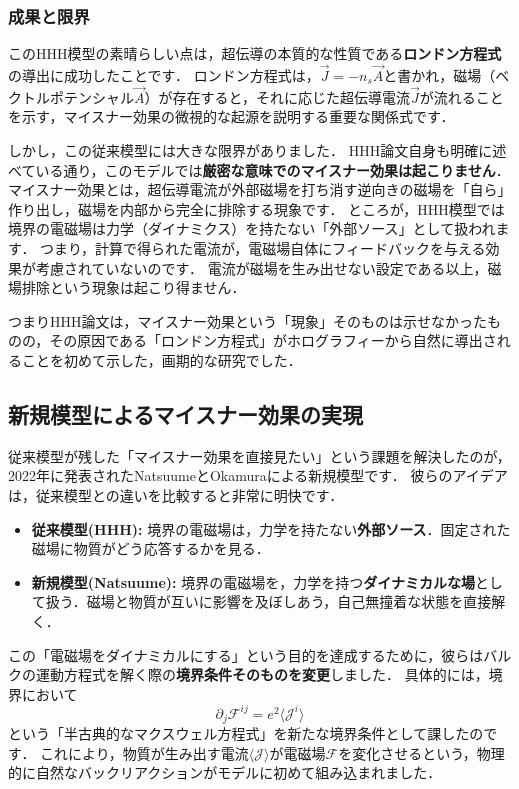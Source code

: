\documentclass[b5paper,11pt,dvipdfmx]{jsarticle}
\numberwithin{equation}{section}
\theoremstyle{definition}
\begin{document}
\subsubsection*{成果と限界}

このHHH模型の素晴らしい点は，超伝導の本質的な性質である\textbf{ロンドン方程式}の導出に成功したことです\cite{Hartnoll08b}．
ロンドン方程式は，$ \vec{J} = -n_s \vec{A} $と書かれ，磁場（ベクトルポテンシャル$\vec{A}$）が存在すると，それに応じた超伝導電流$\vec{J}$が流れることを示す，マイスナー効果の微視的な起源を説明する重要な関係式です．

しかし，この従来模型には大きな限界がありました．
HHH論文自身も明確に述べている通り，このモデルでは\textbf{厳密な意味でのマイスナー効果は起こりません}．
マイスナー効果とは，超伝導電流が外部磁場を打ち消す逆向きの磁場を「自ら」作り出し，磁場を内部から完全に排除する現象です．
ところが，HHH模型では境界の電磁場は力学（ダイナミクス）を持たない「外部ソース」として扱われます．
つまり，計算で得られた電流が，電磁場自体にフィードバックを与える効果が考慮されていないのです．
電流が磁場を生み出せない設定である以上，磁場排除という現象は起こり得ません．

つまりHHH論文は，マイスナー効果という「現象」そのものは示せなかったものの，その原因である「ロンドン方程式」がホログラフィーから自然に導出されることを初めて示した，画期的な研究でした．

\subsection{新規模型によるマイスナー効果の実現}

従来模型が残した「マイスナー効果を直接見たい」という課題を解決したのが，2022年に発表されたNatsuumeとOkamuraによる新規模型です\cite{Natsuume22}．
彼らのアイデアは，従来模型との違いを比較すると非常に明快です．

\begin{itemize}
    \item \textbf{従来模型(HHH):} 境界の電磁場は，力学を持たない\textbf{外部ソース}．固定された磁場に物質がどう応答するかを見る．
    \item \textbf{新規模型(Natsuume):} 境界の電磁場を，力学を持つ\textbf{ダイナミカルな場}として扱う．磁場と物質が互いに影響を及ぼしあう，自己無撞着な状態を直接解く．
\end{itemize}

この「電磁場をダイナミカルにする」という目的を達成するために，彼らはバルクの運動方程式を解く際の\textbf{境界条件そのものを変更}しました．
具体的には，境界において
\begin{equation}
    \partial_{j} \mathcal{F}^{ij} = e^{2} \langle \mathcal{J}^{i} \rangle
\end{equation}
という「半古典的なマクスウェル方程式」を新たな境界条件として課したのです．
これにより，物質が生み出す電流$\langle \mathcal{J} \rangle$が電磁場$\mathcal{F}$を変化させるという，物理的に自然なバックリアクションがモデルに初めて組み込まれました．
\end{document}

